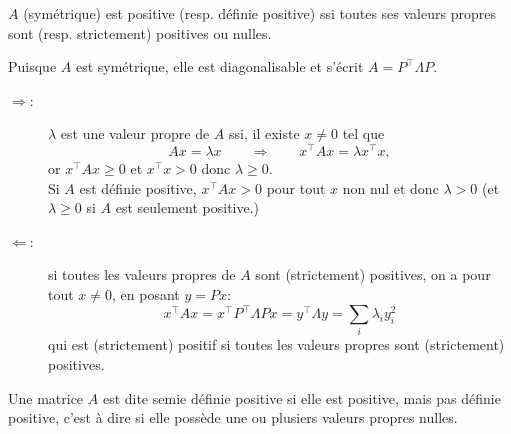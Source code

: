 \begin{proposition}
  $A$ (symétrique) est positive (resp. définie positive) ssi toutes ses valeurs propres sont (resp. strictement) positives ou nulles. 
\end{proposition}

\proof
Puisque $A$ est symétrique, elle est diagonalisable et s'écrit $A = P^\top \Lambda P$.
\begin{description}
  \item[$\Rightarrow$:] $\lambda$ est une valeur propre de $A$ ssi, il existe $x \neq 0$ tel que
  $$
  Ax = \lambda x \qquad \Rightarrow \qquad x^\top A x = \lambda x^\top x,
  $$
  or $x^\top A x \geq 0$ et $x^\top x > 0$ donc $\lambda \geq 0$. \\
  Si $A$ est définie positive, $x^\top A x > 0$ pour tout $x$ non nul et donc $\lambda > 0$ (et $\lambda \geq 0$ si $A$ est seulement positive.)
  \item[$\Leftarrow$:] si toutes les valeurs propres de $A$ sont (strictement) positives, on a pour tout $x \neq 0$, en posant $y = P x$:
  $$
  x^\top A x = x^\top P^\top \Lambda P x = y^\top \Lambda y = \sum_i \lambda_i y_i^2
  $$
  qui est (strictement) positif si toutes les valeurs propres sont (strictement) positives.
\end{description}
\eproof

\remark
Une matrice $A$ est dite semie définie positive si elle est positive, mais pas définie positive, c'est à dire si elle possède une ou plusiers valeurs propres nulles.

% 



